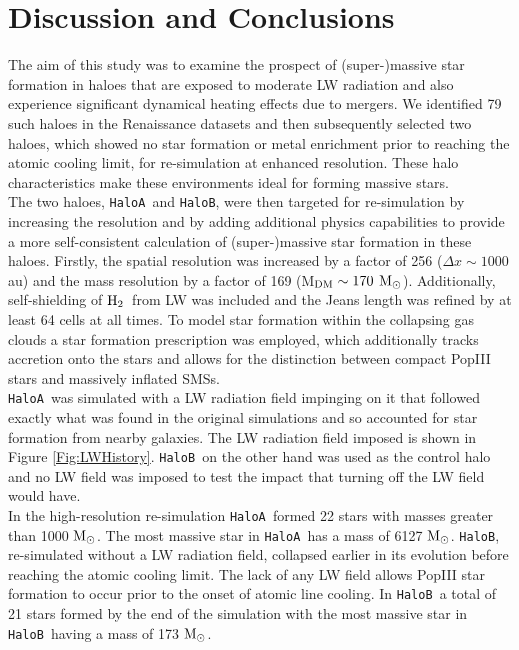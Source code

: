 \documentclass[twocolumn,iop,revtex4]{openjournal}
\newcommand{\msolarc} {$\rm{M_{\odot}}$}
\newcommand{\molH} {$\rm{H_2}$~}
\newcommand{\ha} {\texttt{HaloA~}}
\newcommand{\hb} {\texttt{HaloB~}}
\newcommand{\hbc} {\texttt{HaloB}}
\begin{document}
\section{Discussion and Conclusions} \label{Sec:Discussion}
The aim of this study was to examine the prospect of (super-)massive star formation in haloes
that are exposed to moderate LW radiation and also experience significant dynamical heating
effects due to mergers. We identified 79 such haloes in the Renaissance 
datasets \citep{Regan_2020} and then subsequently selected two haloes, which showed no star formation or metal enrichment prior to reaching the
atomic cooling limit, for re-simulation at enhanced resolution. These halo characteristics make these environments ideal for forming massive
stars. \\
\indent The two haloes, \ha and \hbc, were then targeted for re-simulation by 
increasing the resolution and by adding additional physics capabilities to provide a more self-consistent calculation of (super-)massive star formation in these haloes. Firstly, the spatial resolution was increased by a factor of 256 ($\Delta x \sim 1000$ au) and the mass resolution by a factor of
169 (M$_{\rm DM} \sim 170$ \msolarc). Additionally, self-shielding of \molH from LW was included and the Jeans length was refined by at least 64 cells at all times.  To model star formation within the collapsing gas clouds a star formation prescription was employed, which additionally tracks accretion
onto the stars and allows for the distinction between compact PopIII stars and massively inflated
SMSs. \\
\indent \ha was simulated with a LW radiation field impinging on it that followed exactly what was
found in the original simulations and so accounted for star formation from nearby galaxies. The
LW radiation field imposed is shown in Figure \ref{Fig:LWHistory}. \hb on the other hand was used as the
control halo and no LW field was imposed to test the impact that turning off the LW field would have.\\
\indent In the high-resolution re-simulation \ha formed 22 stars with masses greater than 1000
\msolarc. The most massive star in \ha has a mass of 6127 \msolarc. \hbc, re-simulated without
a LW radiation field, collapsed earlier in its evolution before reaching the atomic cooling limit.
The lack of any LW field allows PopIII star formation to occur prior to the onset of atomic line
cooling. In \hb a total of 21 stars
formed by the end of the simulation with the most massive star in \hb having a mass of 173 \msolarc.
\end{document}
